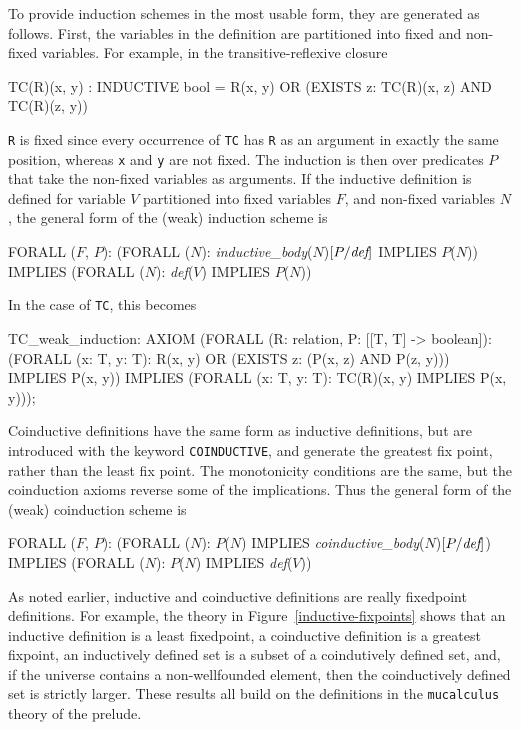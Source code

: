 To provide induction schemes in the most usable form, they are generated
as follows.  First, the variables in the definition are partitioned into
fixed and non-fixed variables.  For
example, in the transitive-reflexive closure
\begin{pvsex}
  TC(R)(x, y) : INDUCTIVE bool =
     R(x, y) OR (EXISTS z: TC(R)(x, z) AND TC(R)(z, y))
\end{pvsex}
\texttt{R} is fixed since every occurrence of \texttt{TC} has \texttt{R}
as an argument in exactly the same position, whereas \texttt{x} and
\texttt{y} are not fixed.  The induction is then over predicates $P$ that
take the non-fixed variables as arguments.  If the inductive definition is
defined for variable $V$ partitioned into fixed variables $F$, and
non-fixed variables $N$, the general form of the (weak) induction scheme
is
\begin{session}
  FORALL (\(F\), \(P\)):
   (FORALL (\(N\)):
     \emph{inductive_body}(\(N\))\([P/\emph{def}]\) IMPLIES \(P\)(\(N\)))
      IMPLIES
     (FORALL (\(N\)): \emph{def}(\(V\)) IMPLIES \(P\)(\(N\)))
\end{session}
In the case of \texttt{TC}, this becomes
\begin{session}
  TC_weak_induction: AXIOM
        (FORALL (R: relation, P: [[T, T] -> boolean]):
           (FORALL (x: T, y: T):
              R(x, y) OR (EXISTS z: (P(x, z) AND P(z, y))) IMPLIES P(x, y))
               IMPLIES (FORALL (x: T, y: T): TC(R)(x, y) IMPLIES P(x, y)));
\end{session}

Coinductive definitions have the same form as inductive definitions, but
are introduced with the keyword \texttt{COINDUCTIVE}, and generate the
greatest fix point, rather than the least fix point.  The monotonicity
conditions are the same, but the coinduction axioms reverse some of the
implications.  Thus the general form of the (weak) coinduction scheme is
\begin{session}
  FORALL (\(F\), \(P\)):
   (FORALL (\(N\)):
     \(P\)(\(N\)) IMPLIES \emph{coinductive_body}(\(N\))\([P/\emph{def}]\))
      IMPLIES
     (FORALL (\(N\)): \(P\)(\(N\)) IMPLIES \emph{def}(\(V\)))
\end{session}

As noted earlier, inductive and coinductive definitions are really
fixedpoint definitions.  For example, the theory in
Figure~\ref{inductive-fixpoints} shows that an
inductive definition is a least fixedpoint, a coinductive definition is a
greatest fixpoint, an inductively defined set is a subset of a
coindutively defined set, and, if the universe contains a non-wellfounded
element, then the coinductively defined set is strictly larger.  These
results all build on the definitions in  the \texttt{mucalculus} theory of
the prelude.

